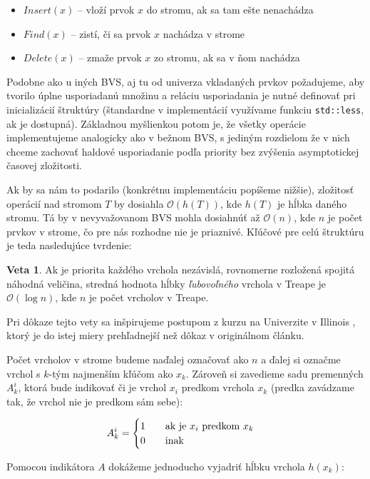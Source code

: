 \documentclass[a4paper, 12pt]{article}
\theoremstyle{definition}
\newtheorem{veta}{Veta}
\begin{document}
\begin{itemize}
    \item $Insert(x)$ -- vloží prvok $x$ do stromu, ak sa tam ešte nenachádza
    \item $Find(x)$ -- zistí, či sa prvok $x$ nachádza v strome
    \item $Delete(x)$ -- zmaže prvok $x$ zo stromu, ak sa v ňom nachádza
\end{itemize}

Podobne ako u iných BVS, aj tu od univerza vkladaných prvkov požadujeme, aby
tvorilo úplne usporiadanú množinu a reláciu usporiadania je nutné definovať pri
inicializácií štruktúry (štandardne v implementácií využívame funkciu
\texttt{std::less}, ak je dostupná). Základnou myšlienkou potom je, že všetky
operácie implementujeme analogicky ako v bežnom BVS, s jediným rozdielom
že v nich chceme zachovať haldové usporiadanie podľa priority bez zvýšenia
asymptotickej časovej zložitosti.

Ak by sa nám to podarilo (konkrétnu implementáciu popíšeme nižšie), zložitosť
operácií nad stromom $T$ by dosiahla $\mathcal{O}(h(T))$, kde $h(T)$ je hĺbka
daného stromu. Tá by v nevyvažovanom BVS mohla dosiahnúť až
$\mathcal{O}(n)$,
kde $n$ je počet prvkov v strome, čo pre nás rozhodne nie je priaznivé. Kľúčové
pre celú štruktúru je teda nasledujúce tvrdenie:

\begin{veta}
    Ak je priorita každého vrchola nezávislá, rovnomerne rozložená spojitá
    náhodná veličina, stredná hodnota hĺbky \emph{ľubovoľného} vrchola v Treape
    je $\mathcal{O}(\log n)$, kde $n$ je počet vrcholov v Treape.
\end{veta}

Pri dôkaze tejto vety sa inšpirujeme postupom z kurzu na Univerzite v Illinois
\cite{erickson},
ktorý je do istej miery prehľadnejší než dôkaz v originálnom článku. 

Počet vrcholov v strome budeme naďalej označovať ako $n$ a ďalej si označme
vrchol s $k$-tým najmenším kľúčom ako $x_k$. Zároveň si
zavedieme sadu premenných $A^i_k$, ktorá bude indikovať či je vrchol $x_i$
predkom vrchola $x_k$ (predka zavádzame tak, že vrchol nie je predkom sám
sebe):

$$
A_k^i = 
\begin{cases}
    \text{$1$\qquad ak je $x_i$ predkom $x_k$} \\
    \text{$0$\qquad inak}
\end{cases}
$$

Pomocou indikátora $A$ dokážeme jednoducho vyjadriť hĺbku vrchola $h(x_k)$:
\end{document}
